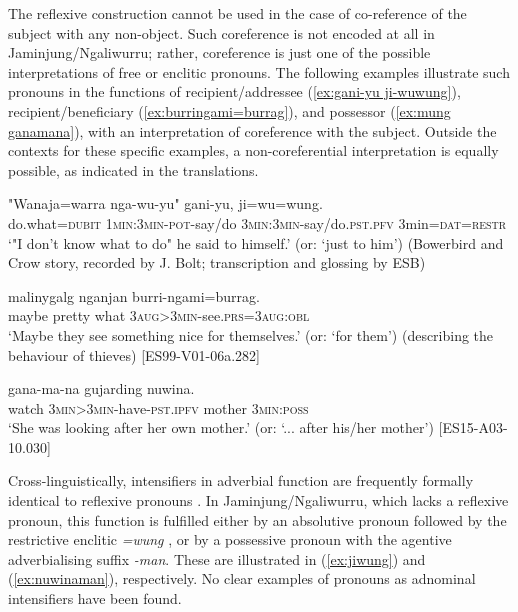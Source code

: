 \documentclass[output=paper,colorlinks,citecolor=brown]{langscibook}
\begin{document}
The reflexive construction cannot be used in the case of co-reference of the subject with any non-object. Such coreference is not encoded at all in Jaminjung/Ngaliwurru; rather, coreference is just one of the possible interpretations of free or enclitic pronouns. The following examples illustrate such pronouns in the functions of recipient/addressee (\ref{ex:gani-yu ji-wuwung}), recipient/beneficiary (\ref{ex:burringami=burrag}), and possessor (\ref{ex:mung ganamana}), with an interpretation of coreference with the subject. Outside the contexts for these specific examples, a non-coreferential interpretation is equally possible, as indicated in the translations.

\ea
\gll "{Wanaja=warra} {nga-wu-yu}" {gani-yu}, {ji=wu=wung}. \\
do.what\textsc{=dubit} \textsc{1min:3min-pot}-say/do \textsc{3min:3min}-say/do.\textsc{pst.pfv} 3min\textsc{=dat=restr}\\
\glt `"I don't know what to do" he said to himself.' (or: `just to him') (Bowerbird and Crow story, recorded by J. Bolt; transcription and glossing by ESB)
\label{ex:gani-yu ji-wuwung}
\z

\ea
{} {malinygalg} {nganjan} {burri-ngami=burrag}. \\
maybe pretty what \textsc{3aug>3min}-see.\textsc{prs=3aug:obl} \\
\glt `Maybe they see something nice for themselves.' (or: `for them') (describing the behaviour of thieves) [ES99-V01-06a.282]
\label{ex:burringami=burrag}
\z

\ea
{} {gana-ma-na} {gujarding}  {nuwina}. \\
watch \textsc{3min>3min}-have-\textsc{pst.ipfv}  mother \textsc{3min:poss} \\
\glt `She was looking after her own mother.' (or: `... after his/her mother') [ES15-A03-10.030]
\label{ex:mung ganamana}
\z

Cross-linguistically, intensifiers in adverbial function are frequently formally identical to reflexive pronouns \citep {Koenig2000, Koenig2013}. In Jaminjung/Ngaliwurru, which lacks a reflexive pronoun, this function is fulfilled either by an absolutive pronoun followed by the restrictive enclitic \textit{=wung} \citep{SchultzeBerndt2002}, or by a possessive pronoun with the agentive adverbialising suffix \textit{-man}. These are illustrated in (\ref{ex:jiwung}) and (\ref{ex:nuwinaman}), respectively. No clear examples of pronouns as adnominal intensifiers have been found.
\end{document}
